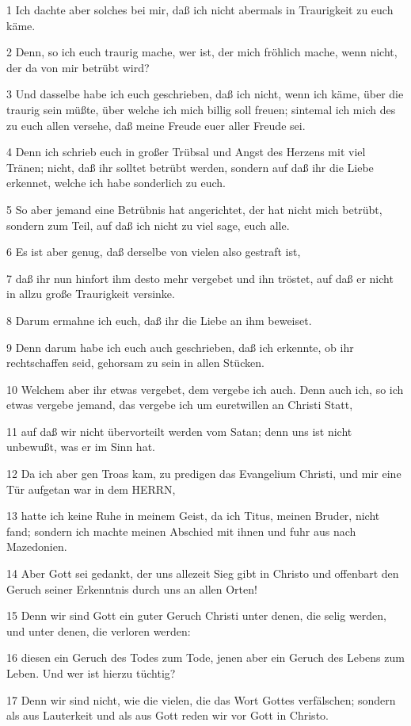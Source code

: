 \par 1 Ich dachte aber solches bei mir, daß ich nicht abermals in Traurigkeit zu euch käme.
\par 2 Denn, so ich euch traurig mache, wer ist, der mich fröhlich mache, wenn nicht, der da von mir betrübt wird?
\par 3 Und dasselbe habe ich euch geschrieben, daß ich nicht, wenn ich käme, über die traurig sein müßte, über welche ich mich billig soll freuen; sintemal ich mich des zu euch allen versehe, daß meine Freude euer aller Freude sei.
\par 4 Denn ich schrieb euch in großer Trübsal und Angst des Herzens mit viel Tränen; nicht, daß ihr solltet betrübt werden, sondern auf daß ihr die Liebe erkennet, welche ich habe sonderlich zu euch.
\par 5 So aber jemand eine Betrübnis hat angerichtet, der hat nicht mich betrübt, sondern zum Teil, auf daß ich nicht zu viel sage, euch alle.
\par 6 Es ist aber genug, daß derselbe von vielen also gestraft ist,
\par 7 daß ihr nun hinfort ihm desto mehr vergebet und ihn tröstet, auf daß er nicht in allzu große Traurigkeit versinke.
\par 8 Darum ermahne ich euch, daß ihr die Liebe an ihm beweiset.
\par 9 Denn darum habe ich euch auch geschrieben, daß ich erkennte, ob ihr rechtschaffen seid, gehorsam zu sein in allen Stücken.
\par 10 Welchem aber ihr etwas vergebet, dem vergebe ich auch. Denn auch ich, so ich etwas vergebe jemand, das vergebe ich um euretwillen an Christi Statt,
\par 11 auf daß wir nicht übervorteilt werden vom Satan; denn uns ist nicht unbewußt, was er im Sinn hat.
\par 12 Da ich aber gen Troas kam, zu predigen das Evangelium Christi, und mir eine Tür aufgetan war in dem HERRN,
\par 13 hatte ich keine Ruhe in meinem Geist, da ich Titus, meinen Bruder, nicht fand; sondern ich machte meinen Abschied mit ihnen und fuhr aus nach Mazedonien.
\par 14 Aber Gott sei gedankt, der uns allezeit Sieg gibt in Christo und offenbart den Geruch seiner Erkenntnis durch uns an allen Orten!
\par 15 Denn wir sind Gott ein guter Geruch Christi unter denen, die selig werden, und unter denen, die verloren werden:
\par 16 diesen ein Geruch des Todes zum Tode, jenen aber ein Geruch des Lebens zum Leben. Und wer ist hierzu tüchtig?
\par 17 Denn wir sind nicht, wie die vielen, die das Wort Gottes verfälschen; sondern als aus Lauterkeit und als aus Gott reden wir vor Gott in Christo.

